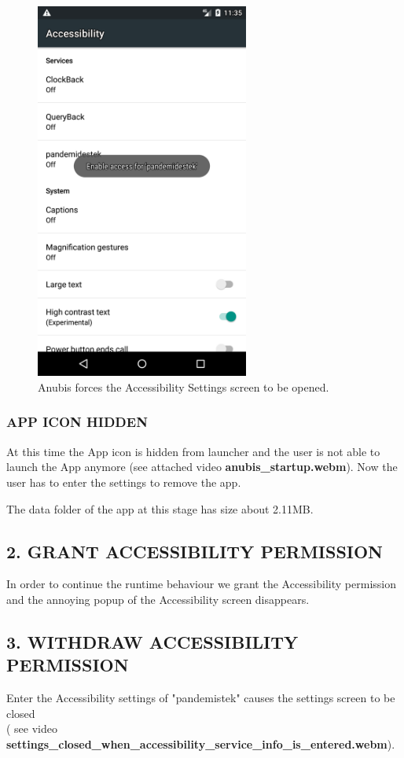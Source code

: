 \documentclass[10pt,titlepage]{article}
\begin{document}
\begin{figure}[H]
  \begin{center}
  \includegraphics[width=7cm]{anubis_accessibility.png}
  \end{center}
  \caption{Anubis forces the Accessibility Settings screen to be opened.}
  \label{fig:anubis_open_accessibiltiy}
\end{figure}


\subsubsection{APP ICON HIDDEN}
At this time the App icon is hidden from launcher and the user is not able to launch the App anymore (see attached video \textbf{anubis\_startup.webm}). Now the user has to enter the settings to remove the app.

The data folder of the app at this stage has size about 2.11MB.



\subsection{2. GRANT ACCESSIBILITY PERMISSION}
In order to continue the runtime behaviour we grant the Accessibility permission and the annoying popup of the Accessibility screen disappears.



\subsection{3. WITHDRAW ACCESSIBILITY PERMISSION}
Enter the Accessibility settings of "pandemistek" causes the settings screen to be closed 
\\  ( see video \textbf{settings\_closed\_when\_accessibility\_service\_info\_is\_entered.webm}).
\end{document}

